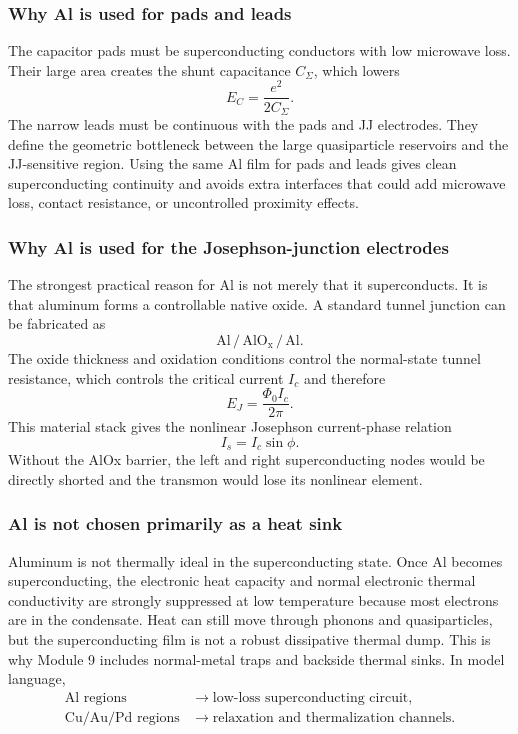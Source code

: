\documentclass[11pt]{article}
\begin{document}
\subsubsection{Why Al is used for pads and leads}
The capacitor pads must be superconducting conductors with low microwave loss. Their large area creates the shunt capacitance $C_{\Sigma}$, which lowers
\begin{equation}
    E_C=\frac{e^2}{2C_{\Sigma}}.
\end{equation}
The narrow leads must be continuous with the pads and JJ electrodes. They define the geometric bottleneck between the large quasiparticle reservoirs and the JJ-sensitive region. Using the same Al film for pads and leads gives clean superconducting continuity and avoids extra interfaces that could add microwave loss, contact resistance, or uncontrolled proximity effects.

\subsubsection{Why Al is used for the Josephson-junction electrodes}
The strongest practical reason for Al is not merely that it superconducts. It is that aluminum forms a controllable native oxide. A standard tunnel junction can be fabricated as
\begin{equation}
    \mathrm{Al}\,/\,\mathrm{AlO_x}\,/\,\mathrm{Al}.
\end{equation}
The oxide thickness and oxidation conditions control the normal-state tunnel resistance, which controls the critical current $I_c$ and therefore
\begin{equation}
    E_J=\frac{\Phi_0 I_c}{2\pi}.
\end{equation}
This material stack gives the nonlinear Josephson current-phase relation
\begin{equation}
    I_s=I_c\sin\phi.
\end{equation}
Without the AlOx barrier, the left and right superconducting nodes would be directly shorted and the transmon would lose its nonlinear element.

\subsubsection{Al is not chosen primarily as a heat sink}
Aluminum is not thermally ideal in the superconducting state. Once Al becomes superconducting, the electronic heat capacity and normal electronic thermal conductivity are strongly suppressed at low temperature because most electrons are in the condensate. Heat can still move through phonons and quasiparticles, but the superconducting film is not a robust dissipative thermal dump. This is why Module 9 includes normal-metal traps and backside thermal sinks. In model language,
\begin{equation}
\begin{aligned}
\text{Al regions} &\rightarrow \text{low-loss superconducting circuit}, \\
\text{Cu/Au/Pd regions} &\rightarrow \text{relaxation and thermalization channels}.
\end{aligned}
\end{equation}
\end{document}
